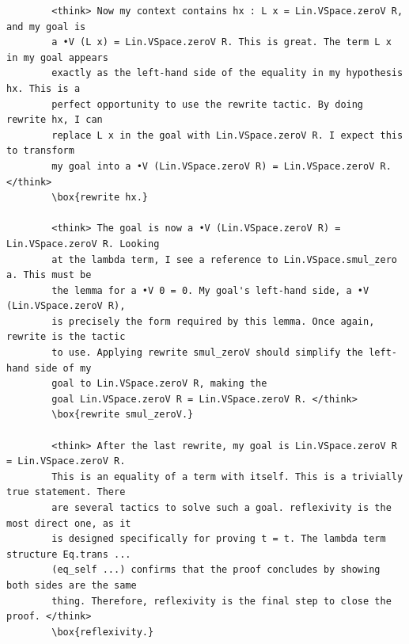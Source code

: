 \documentclass{article}
\theoremstyle{plain}
\theoremstyle{definition}
\theoremstyle{remark}
\begin{document}
\begin{small}
\begin{verbatim}
		<think> Now my context contains hx : L x = Lin.VSpace.zeroV R, and my goal is
		a •V (L x) = Lin.VSpace.zeroV R. This is great. The term L x in my goal appears
		exactly as the left-hand side of the equality in my hypothesis hx. This is a
		perfect opportunity to use the rewrite tactic. By doing rewrite hx, I can
		replace L x in the goal with Lin.VSpace.zeroV R. I expect this to transform
		my goal into a •V (Lin.VSpace.zeroV R) = Lin.VSpace.zeroV R. </think>
		\box{rewrite hx.}
		
		<think> The goal is now a •V (Lin.VSpace.zeroV R) = Lin.VSpace.zeroV R. Looking
		at the lambda term, I see a reference to Lin.VSpace.smul_zero a. This must be
		the lemma for a •V 0 = 0. My goal's left-hand side, a •V (Lin.VSpace.zeroV R),
		is precisely the form required by this lemma. Once again, rewrite is the tactic
		to use. Applying rewrite smul_zeroV should simplify the left-hand side of my
		goal to Lin.VSpace.zeroV R, making the
		goal Lin.VSpace.zeroV R = Lin.VSpace.zeroV R. </think>
		\box{rewrite smul_zeroV.}
		
		<think> After the last rewrite, my goal is Lin.VSpace.zeroV R = Lin.VSpace.zeroV R.
		This is an equality of a term with itself. This is a trivially true statement. There
		are several tactics to solve such a goal. reflexivity is the most direct one, as it
		is designed specifically for proving t = t. The lambda term structure Eq.trans ...
		(eq_self ...) confirms that the proof concludes by showing both sides are the same
		thing. Therefore, reflexivity is the final step to close the proof. </think>
		\box{reflexivity.}
	\end{verbatim}
	        \end{small}

	
\end{document}
